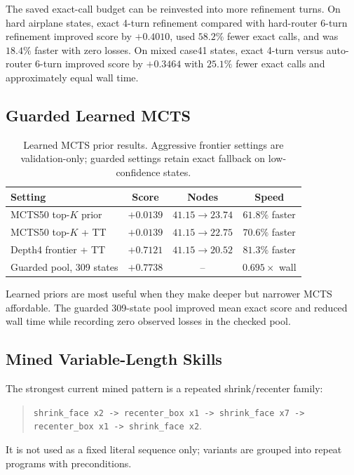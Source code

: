 \documentclass[10pt,twocolumn,letterpaper]{article}
\begin{document}
The saved exact-call budget can be reinvested into more refinement turns.  On
hard airplane states, exact 4-turn refinement compared with hard-router 6-turn
refinement improved score by $+0.4010$, used $58.2\%$ fewer exact calls, and was
$18.4\%$ faster with zero losses.  On mixed case41 states, exact 4-turn versus
auto-router 6-turn improved score by $+0.3464$ with $25.1\%$ fewer exact calls
and approximately equal wall time.

\subsection{Guarded Learned MCTS}

\begin{table}[t]
\centering
\small
\begin{tabularx}{\linewidth}{lccc}
\toprule
Setting & Score & Nodes & Speed \\
\midrule
MCTS50 top-$K$ prior & $+0.0139$ & $41.15 \rightarrow 23.74$ & $61.8\%$ faster \\
MCTS50 top-$K$ + TT & $+0.0139$ & $41.15 \rightarrow 22.75$ & $70.6\%$ faster \\
Depth4 frontier + TT & $+0.7121$ & $41.15 \rightarrow 20.52$ & $81.3\%$ faster \\
Guarded pool, 309 states & $+0.7738$ & -- & $0.695\times$ wall \\
\bottomrule
\end{tabularx}
\caption{Learned MCTS prior results.  Aggressive frontier settings are
validation-only; guarded settings retain exact fallback on low-confidence
states.}
\label{tab:mcts}
\end{table}

Learned priors are most useful when they make deeper but narrower MCTS
affordable.  The guarded 309-state pool improved mean exact score and reduced
wall time while recording zero observed losses in the checked pool.

\subsection{Mined Variable-Length Skills}

The strongest current mined pattern is a repeated shrink/recenter family:
\begin{quote}
\texttt{shrink\_face x2 -> recenter\_box x1 -> shrink\_face x7 ->}
\texttt{ recenter\_box x1 -> shrink\_face x2}.
\end{quote}
It is not used as a fixed literal sequence only; variants are grouped into
repeat programs with preconditions.
\end{document}
